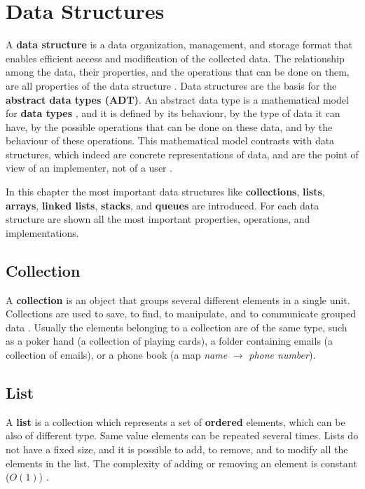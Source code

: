 \chapter{Data Structures}
\label{chp:datastrucutres}
A \textbf{data structure} is a data organization, management, and storage format that enables efficient access and modification of the collected data. The relationship among the data, their properties, and the operations that can be done on them, are all properties of the data structure \cite{wikidatastructure}. Data structures are the basis for the \textbf{abstract data types (ADT)}. An abstract data type is a mathematical model for \textbf{data types} \cite{wikidatatype}, and it is defined by its behaviour, by the type of data it can have, by the possible operations that can be done on these data, and by the behaviour of these operations. This mathematical model contrasts with data structures, which indeed are concrete representations of data, and are the point of view of an implementer, not of a user \cite{wikiabstractdatatype}.

In this chapter the most important data structures like \textbf{collections}, \textbf{lists}, \textbf{arrays}, \textbf{linked lists}, \textbf{stacks}, and \textbf{queues} are introduced. For each data structure are shown all the most important properties, operations, and implementations.

\section{Collection}
A \textbf{collection} is an object that groups several different elements in a single unit. Collections are used to save, to find, to manipulate, and to communicate grouped data \cite{wikicollection}. Usually the elements belonging to a collection are of the same type, such as a poker hand (a collection of playing cards), a folder containing emails (a collection of emails), or a phone book (a map \textit{name} \(\rightarrow\) \textit{phone number}).

\section{List}
A \textbf{list} is a collection which represents a set of \textbf{ordered} elements, which can be also of different type. Same value elements can be repeated several times. Lists do not have a fixed size, and it is possible to add, to remove, and to modify all the elements in the list. The complexity of adding or removing an element is constant (\(O(1)\)) \cite{wikilist}.

